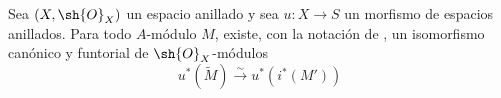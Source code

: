 \begin{corollary}[1.8.6]
\label{ega2:addendum:I.1.8.6-fr}
Sea $(X,\sh{O}_X)$ un espacio anillado y sea $u:X\to S$ un morfismo de
espacios anillados. Para todo $A$-módulo $M$, existe, con la notación
de , un isomorfismo canónico y funtorial de
$\sh{O}_X$-módulos
\begin{equation}
\label{ega2:addendum:I.1.8.6.1-fr}
  u^*(\widetilde M)\xrightarrow{\sim} u^*(i^*(M'))
\tag{1.8.6.1}
\end{equation}
\end{corollary}

